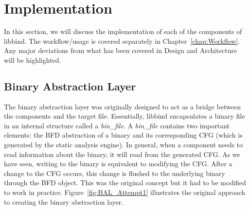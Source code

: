 \chapter{Implementation}\label{chap:Implementation}

In this section, we will discuss the implementation of each of the components of libbind. The workflow/usage is covered separately in Chapter~\ref{chap:Workflow}. Any major deviations from what has been covered in Design and Architecture will be highlighted.

\section{Binary Abstraction Layer}

The binary abstraction layer was originally designed to act as a bridge between the components and the target file. Essentially, libbind encapsulates a binary file in an internal structure called a \emph{bin\_file}. A \emph{bin\_file} contains two important elements: the BFD abstraction of a binary and its corresponding CFG (which is generated by the static analysis engine). In general, when a component needs to read information about the binary, it will read from the generated CFG. As we have seen, writing to the binary is equivalent to modifying the CFG. After a change to the CFG occurs, this change is flushed to the underlying binary through the BFD object. This was the original concept but it had to be modified to work in practice. Figure~\ref{fig:BAL_Attempt1} illustrates the original approach to creating the binary abstraction layer.

